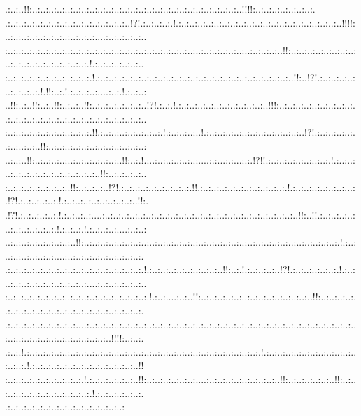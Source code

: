 \documentclass[paper=a4, fontsize=11pt]{scrartcl} %
\numberwithin{equation}{section} %
\numberwithin{figure}{section} %
\numberwithin{table}{section} %
\begin{document}
.:..:..!!:..:..:..:..:..:..:..:..:..:..:..:..:..:..:..:..:..:..:..:..:..:..:..:..:..:..!!!!:..:..:..:..:..:..:..:.\\.:..:..:..:..:..:..:..:..:..:..:..:..:..:..:..!?!.:..:..:..:.!.:..:..:..:..:..:..:..:..:..:..:..:..:..:..:..:..:..:..:..:..!!!!:..:..:..:..:..:..:..:..:..:..:..:....:..:..:..:..:..\\:..:..:..:..:..:..:..:..:..:..:..:..:..:..:..:..:..:..:..:..:..:..:..:..:..:..:..:..:..:..:..:..:..:..!!:..:..:..:..:..:..:..:..:..:..:..:..:..:..:..:..:..:..:.!.:..:..:..:..:..:..\\:..:..:..:..:..:..:..:..:..:..:.!.:..:..:..:..:..:..:..:..:..:..:..:..:..:..:..:..:..:..:..:..:..:..:..:..!!:..!?!.:..:..:..:..:..:..:..:..:.!.!!:..:.!.:..:..:..:....:..:.!.:..:..:\\..!!:..:..!!:..:..!!:..:..:..!!:..:..:..:..:..:..:..!?!.:..:.!.:..:..:..:..:..:..:..:..:..:..:..!!!:..:..:..:..:..:..:..:..:..:..:..:..:..:..:..:..:..:..:..:..:..:..:..:..:..:..:..\\:..:..:..:..:..:..:..:..:..:..:.!!.:..:..:..:..:..:..:..:.!.:..:..:..:..!.:..:..:..:..:..:..:..:..:..:..:..:..!?!.:..:..:..:..:..:..:..:..:..!!:..:..:..:..:..:..:..:..:..:..:..:..:\\..:..:..!!:..:..:..:..:..:..:..:..:..:..:..!!:..:.!.:..:..:..:..:..:..:....:.:...:.:...:.:.!?!!.:..:..:..:..:..:..:..:.!.:..:..:..:..:..:..:..:..:..:..:..:..:..:..!!:..:..:..:..:..\\:..:..:..:..:..:..:..:..!!:..:..:..:..!?!.:..:..:..:..:..:..:..:..:.!!.:..:..:..:..:..:..:..:..:..:..:.!.:..:..:..:..:..:..:...:.!?!.:..:..:..:..:.!.:..:..:..:..:..:..:..:..:..!!:.\\.!?!.:..:..:..:..:.!.:..:..:..:....:..:..:..:..:..:..:..:..:..:..:..:..:..:..:..:..:..:..:..:..:..:..:..:..!!:..!!.:..:..:..:..:..:..:..:..:..:..:.!.:..:..:.!.:..:..:..:....:..:..:\\..:..:..:..:..:..:..:..:..!!:..:..:..:..:..:..:..:..:..:..:..:..:..:..:..:..:..:..:..:..:..:..:..:..:..:..:..:..:..:..:..:.!.:..:..:..:..:..:..:..:....:..:..:..:..:..:..:..:..:..:.\\.:..:..:..:..:..:..:..:..:..:..:..:..:..:..:..:..:.!.:..:..:..:..:..:..:..:..:..!!:..:.!.:..:..:..:..!?!.:..:..:..:..:..:.!.:..:..:..:..:..:..:..:..:..:..:..:....:..:..:..:..:..:..\\:..:..:..:..:..:..:..:..:..:..:..:..:..:..:..:..:..:.!.:..:....:..:..!!:..:..:..:..:..:..:..:..:..:..:..:..:..:..!!:..:..:..:..:..:..:..:..:..:..:..:..:..:..:..:..:..:..:..:..:..:.\\.:..:..:..:..:..:..:..:..:....:..:..:..:..:..:..:..:..:..:..:..:..:..:..:..:..:..:..:..:..:..:..:..:..:..:..:..:..:..:..:..:..:..:..:..:..:..:..:..:..:..:..:..:..:..:..!!!!:..:..:.\\.:..:.!.:..:..:..:..:..:..:..:..:..:..:..:..:..:..:..:..:..:..:..:..:..:..:..:..:..:..:..:..:.!.:..:..:..:..:..:..:..:..:..:..:..:..:..:.!.:..:..:..:..:..:..:..:..:..:..:..:..:..!!\\:..:..:..:..:..:..:..:..:..:.!.:..:..:..:..:..:..!!:..:..:..:..:..:..:....:..:..:..:..:..:..:..:..:..!!:..:..:..:..:..:..!!:..:..:..:..:..:..:..:..:..:..:..:..:.!.:..:..:..:..:..:.\\.:..:..:..:..:..:..:..:..:..:..:..:..:..:..:
\end{document}
